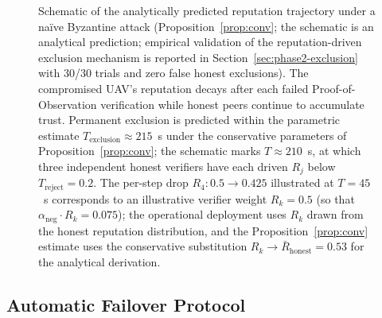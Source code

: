 \documentclass[journal,10pt,twocolumn]{IEEEtran}
\begin{document}
\begin{figure}[t]
\centering
{}
\caption{Schematic of the analytically predicted reputation trajectory under a na\"ive Byzantine attack (Proposition~\ref{prop:conv}; the schematic is an analytical prediction; empirical validation of the reputation-driven exclusion mechanism is reported in Section~\ref{sec:phase2-exclusion} with 30/30 trials and zero false honest exclusions). The compromised UAV's reputation decays after each failed Proof-of-Observation verification while honest peers continue to accumulate trust. Permanent exclusion is predicted within the parametric estimate $T_\text{exclusion}\approx 215$~s under the conservative parameters of Proposition~\ref{prop:conv}; the schematic marks $T\!\approx\!210$~s, at which three independent honest verifiers have each driven $R_j$ below $T_\text{reject}=0.2$. The per-step drop $R_4: 0.5\to 0.425$ illustrated at $T{=}45$~s corresponds to an illustrative verifier weight $R_k=0.5$ (so that $\alpha_\text{neg}\cdot R_k = 0.075$); the operational deployment uses $R_k$ drawn from the honest reputation distribution, and the Proposition~\ref{prop:conv} estimate uses the conservative substitution $R_k\to\bar{R}_\text{honest}=0.53$ for the analytical derivation.}
\label{fig:repu}
\end{figure}

\subsection{Automatic Failover Protocol}
\end{document}
